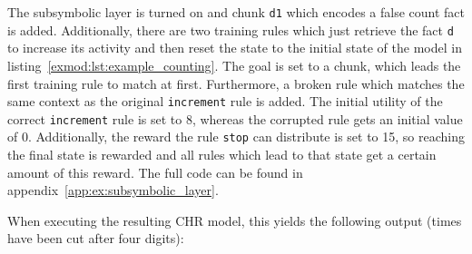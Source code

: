 The subsymbolic layer is turned on and chunk \lstinline|d1| which encodes a false count fact is added. Additionally, there are two training rules which just retrieve the fact \lstinline|d| to increase its activity and then reset the state to the initial state of the model in listing~\ref{exmod:lst:example_counting}. The goal is set to a chunk, which leads the first training rule to match at first. Furthermore, a broken rule which matches the same context as the original \lstinline|increment| rule is added. The initial utility of the correct \lstinline|increment| rule is set to 8, whereas the corrupted rule gets an initial value of 0. Additionally, the reward the rule \lstinline|stop| can distribute is set to 15, so reaching the final state is rewarded and all rules which lead to that state get a certain amount of this reward. The full code can be found in appendix~\ref{app:ex:subsymbolic_layer}. 

When executing the resulting CHR model, this yields the following output (times have been cut after four digits):

